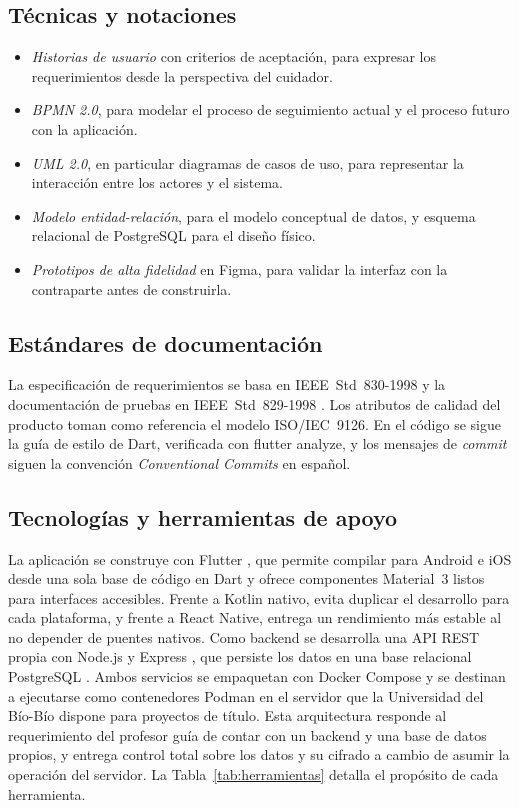 \subsection{Técnicas y notaciones}

\begin{itemize}
    \item \emph{Historias de usuario} con criterios de aceptación, para expresar
    los requerimientos desde la perspectiva del cuidador.
    \item \emph{BPMN 2.0}, para modelar el proceso de seguimiento actual y el
    proceso futuro con la aplicación.
    \item \emph{UML 2.0}, en particular diagramas de casos de uso, para
    representar la interacción entre los actores y el sistema.
    \item \emph{Modelo entidad-relación}, para el modelo conceptual de datos, y
    esquema relacional de PostgreSQL para el diseño físico.
    \item \emph{Prototipos de alta fidelidad} en Figma, para validar la interfaz
    con la contraparte antes de construirla.
\end{itemize}

\subsection{Estándares de documentación}

La especificación de requerimientos se basa en IEEE~Std~830-1998
\citep{ieee_830_1998} y la documentación de pruebas en IEEE~Std~829-1998
\citep{ieee_829_1998}. Los atributos de calidad del producto toman como
referencia el modelo ISO/IEC~9126. En el código se sigue la guía de estilo de
Dart, verificada con flutter analyze, y los mensajes de
\emph{commit} siguen la convención \emph{Conventional Commits} en español.

\subsection{Tecnologías y herramientas de apoyo}

La aplicación se construye con Flutter \citep{flutter_2026}, que permite
compilar para Android e iOS desde una sola base de código en Dart y ofrece
componentes Material~3 listos para interfaces accesibles. Frente a Kotlin
nativo, evita duplicar el desarrollo para cada plataforma, y frente a React
Native, entrega un rendimiento más estable al no depender de puentes nativos.
Como backend se desarrolla una API REST propia con Node.js
\citep{nodejs_2026} y Express \citep{express_2026}, que persiste los datos en
una base relacional PostgreSQL \citep{postgresql_2026}. Ambos servicios se
empaquetan con Docker Compose \citep{docker_2026} y se destinan a ejecutarse como
contenedores Podman \citep{podman_2026} en el servidor que la Universidad del
Bío-Bío dispone para proyectos de título. Esta arquitectura responde al
requerimiento del profesor guía de contar con un backend y una base de datos
propios, y entrega control total sobre los datos y su cifrado a cambio de
asumir la operación del servidor. La Tabla~\ref{tab:herramientas} detalla el
propósito de cada herramienta.

